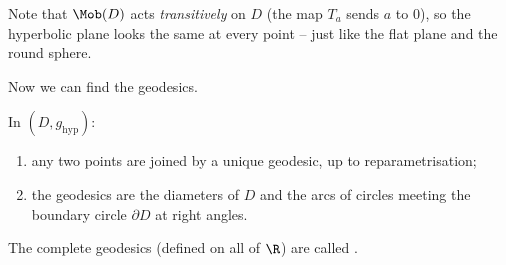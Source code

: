 Note that $\Mob(D)$ acts \emph{transitively} on $D$ (the map $T_a$ sends $a$ to $0$), so the hyperbolic plane looks the same at every point -- just like the flat plane and the round sphere.

Now we can find the geodesics.

\begin{proposition}\label{prop:discgeodesics}
    In $(D, g_{\mathrm{hyp}})$:
    \begin{enumerate}[label=(\roman*)]
        \item any two points are joined by a unique geodesic, up to reparametrisation;
        \item the geodesics are the diameters of $D$ and the arcs of circles meeting the boundary circle $\partial D$ at right angles.
    \end{enumerate}
    The complete geodesics (defined on all of $\R$) are called .
\end{proposition}
\begin{center}
\end{center}
